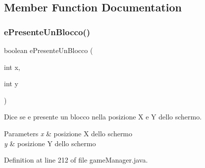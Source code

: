 \subsection{Member Function Documentation}
\mbox{\label{class_snake_1_1game_1_1utility_1_1game_manager_ac24833a417b3bd7c60e29ed5b7edc29f}} 
\subsubsection{\texorpdfstring{e\+Presente\+Un\+Blocco()}{ePresenteUnBlocco()}}
{\footnotesize\ttfamily boolean e\+Presente\+Un\+Blocco (\begin{DoxyParamCaption}\item[{int}]{x,  }\item[{int}]{y }\end{DoxyParamCaption})}



Dice se e\textquotesingle{} presente un blocco nella posizione X e Y dello schermo. 


\begin{DoxyParams}{Parameters}
{\em x} & posizione X dello schermo \\
\hline
{\em y} & posizione Y dello schermo \\
\hline
\end{DoxyParams}


Definition at line 212 of file game\+Manager.\+java.

